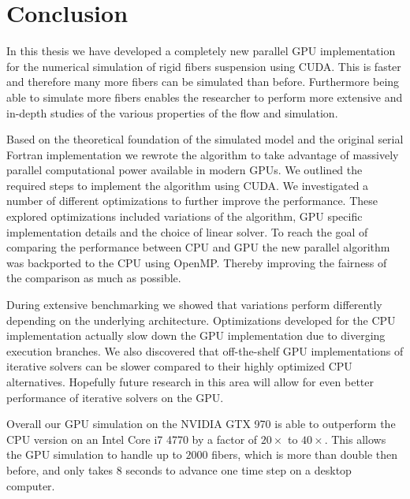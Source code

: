 \chapter{Conclusion}

In this thesis we have developed a completely new parallel GPU implementation for the numerical simulation of rigid fibers suspension using CUDA. This is faster and therefore many more fibers can be simulated than before. Furthermore being able to simulate more fibers enables the researcher to perform more extensive and in-depth studies of the various properties of the flow and simulation.

Based on the theoretical foundation of the simulated model and the original serial Fortran implementation we rewrote the algorithm to take advantage of massively parallel computational power available in modern GPUs. We outlined the required steps to implement the algorithm using CUDA. We investigated a number of different optimizations to further improve the performance. These explored optimizations included variations of the algorithm, GPU specific implementation details and the choice of linear solver. To reach the goal of comparing the performance between CPU and GPU the new parallel algorithm was backported to the CPU using OpenMP. Thereby improving the fairness of the comparison as much as possible.

During extensive benchmarking we showed that variations perform differently depending on the underlying architecture. Optimizations developed for the CPU implementation actually slow down the GPU implementation due to diverging execution branches. We also discovered that off-the-shelf GPU implementations of iterative solvers can be slower compared to their highly optimized CPU alternatives. Hopefully future research in this area will allow for even better performance of iterative solvers on the GPU.

Overall our GPU simulation on the NVIDIA GTX 970 is able to outperform the CPU version on an Intel Core i7 4770 by a factor of $20×$ to $40×$. This allows the GPU simulation to handle up to $2000$ fibers, which is more than double then before, and only takes $8$ seconds to advance one time step on a desktop computer.


